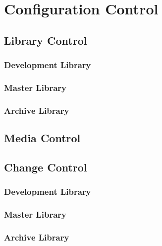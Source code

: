 \chapter{Configuration Control}
\label{chap:configurationcontrol}

\section{Library Control}
\subsection{Development Library}
\label{subsec:configcontrol-library-dev}
\subsection{Master Library}
\subsection{Archive Library}

\section{Media Control}

\section{Change Control}
\subsection{Development Library}
\subsection{Master Library}
\subsection{Archive Library}